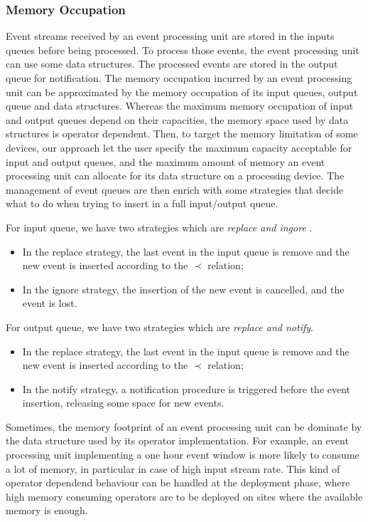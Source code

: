 \documentclass[a4paper,twoside]{article}
\begin{document}
\subsubsection{Memory Occupation}
Event streams received by an event processing unit are stored in the inputs queues before being processed. To process those events, the event processing unit can use some data structures. The processed events are stored in the output queue for notification. The memory occupation incurred by an event processing unit can be approximated by the memory occupation of its input queues, output queue and data structures. Whereas the maximum memory occupation of input and output queues depend on their capacities, the memory space used by data structures is operator dependent. Then, to target the memory limitation of some devices, our approach let the user specify the maximum capacity acceptable for input and output queues, and the maximum amount of memory an event processing unit can allocate for its data structure on a processing device. The management of event queues are then enrich with some strategies that decide what to do when trying to insert in a full input/output queue.

For input queue, we have two strategies which are \textit{replace and ingore }.
\begin{itemize}
\item In the replace strategy, the last event in the input queue is remove and the new event is inserted according to the $\prec$ relation;
\item In the ignore strategy, the insertion of the new event is cancelled, and the event is lost.
\end{itemize} 



For output queue, we have two strategies which are \textit{replace and notify}.
\begin{itemize}
\item In the replace strategy, the last event in the input queue is remove and the new event is inserted according to the $\prec$ relation;
\item In the notify strategy, a notification procedure is triggered before the event insertion, releasing some space for new events. 
\end{itemize} 
Sometimes, the memory footprint of an event processing unit can be dominate by the data structure used by its operator implementation. For example, an event processing unit implementing a one hour event window is more likely to consume a lot of memory, in particular in case of high input stream rate. This kind of operator dependend behaviour can be handled at the deployment phase, where high memory consuming operators are to be deployed on sites where the available memory is enough.    
\end{document}

